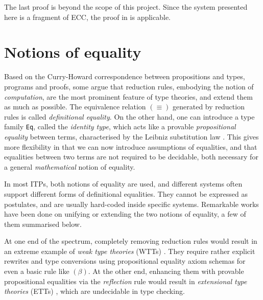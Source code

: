 \documentclass[twoside]{report}
\begin{document}
The last proof is beyond the scope of this project. Since the system presented here is a fragment of ECC, the proof in \cite{luo1990extended} is applicable.

\section{Notions of equality}
\label{sec:notions_of_equality}

Based on the Curry-Howard correspondence between propositions and types, programs and proofs, some argue that reduction rules, embodying the notion of \emph{computation}, are the most prominent feature of type theories, and extend them as much as possible. The equivalence relation $(\equiv)$ generated by reduction rules is called \emph{definitional equality}. On the other hand, one can introduce a type family \texttt{Eq}, called the \emph{identity type}, which acts like a provable \emph{propositional equality} between terms, characterised by the Leibniz substitution law \cite{program2013homotopy}. This gives more flexibility in that we can now introduce assumptions of equalities, and that equalities between two terms are not required to be decidable, both necessary for a general \emph{mathematical} notion of equality.

In most ITPs, both notions of equality are used, and different systems often support different forms of definitional equalities. They cannot be expressed as postulates, and are usually hard-coded inside specific systems. Remarkable works have been done on unifying or extending the two notions of equality, a few of them summarised below.

At one end of the spectrum, completely removing reduction rules would result in an extreme example of \emph{weak type theories} (WTTs) \cite{berg2021quadratic}. They require rather explicit rewrites and type conversions using propositional equality axiom schemas for even a basic rule like $(\beta)$. At the other end, enhancing them with provable propositional equalities via the \emph{reflection} rule would result in \emph{extensional type theories} (ETTs) \cite{constable1986implementing}, which are undecidable in type checking. %
\end{document}

